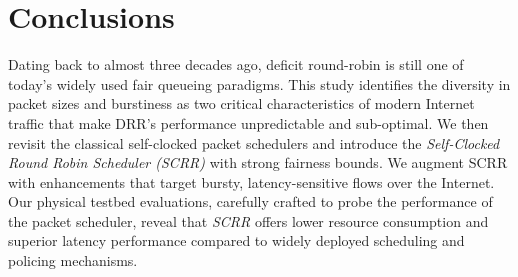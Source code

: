 \section{Conclusions}
\label{sec:scrr-conclusions}
 Dating back to almost three decades ago, deficit round-robin is still one of today's widely used fair queueing paradigms. 
 This study identifies the diversity in packet sizes and burstiness as two critical characteristics of modern Internet traffic that make DRR's performance unpredictable and sub-optimal.
 We then revisit the classical self-clocked packet schedulers and introduce the \textit{Self-Clocked Round Robin Scheduler (SCRR)} with strong fairness bounds. We augment SCRR with enhancements that target bursty, latency-sensitive flows over the Internet. Our physical testbed evaluations, carefully crafted to probe the performance of the packet scheduler, reveal that \textit{SCRR} offers lower resource consumption and superior latency performance compared to widely deployed scheduling and policing mechanisms. 